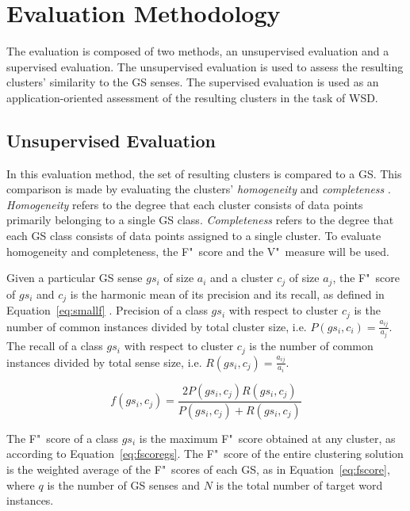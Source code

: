 \section{Evaluation Methodology}
\label{sec:eval-method}

The evaluation is composed of two methods, an unsupervised evaluation and a
supervised evaluation. The unsupervised evaluation is used to assess the
resulting clusters' similarity to the \acf{GS} senses. The supervised evaluation
is used as an application-oriented assessment of the resulting clusters in the
task of \ac{WSD}.

\subsection{Unsupervised Evaluation}
\label{subsec:unsupeval}

In this evaluation method, the set of resulting clusters is compared to a
\ac{GS}. This comparison is made by evaluating the clusters'
\textit{homogeneity} and \textit{completeness} \citep{manandhar2009semeval}. 
\emph{Homogeneity} refers to the degree that each cluster consists of data 
points primarily belonging to a single \ac{GS} class. \emph{Completeness} 
refers to the degree that each \ac{GS} class consists of data points assigned 
to a single cluster. To evaluate homogeneity and completeness, the F"~score and 
the V"~measure will be used.

Given a particular \ac{GS} sense $gs_i$ of size $a_i$ and a cluster $c_j$ of
size $a_j$, the F"~score of $gs_i$ and $c_j$ is the harmonic mean of its
precision and its recall, as defined in Equation~\ref{eq:smallf}
\citep{agirre2007semeval}. Precision of a class $gs_i$ with respect to cluster
$c_j$ is the number of common instances divided by total cluster size, i.e.
$P(gs_i, c_i) = \frac{a_{ij}}{a_j}$. The recall of a class $gs_i$ with respect
to cluster $c_j$ is the number of common instances divided by total sense size,
i.e. $R(gs_i, c_j) = \frac{a_ {ij}}{a_i}$.

\begin{equation} \label{eq:smallf}
 f(gs_i, c_j) = \frac{2P(gs_i,c_j)R(gs_i,c_j)}
                     {P(gs_i,c_j) + R(gs_i,c_j)}
\end{equation}

The F"~score of a class $gs_i$ is the maximum F"~score obtained at any cluster, 
as according to Equation~\ref{eq:fscoregs}. The F"~score of the entire
clustering solution is the weighted average of the F"~scores of each \ac{GS}, 
as in Equation~\ref{eq:fscore}, where $q$ is the number of \ac{GS} senses and 
$N$ is the total number of target word instances.

